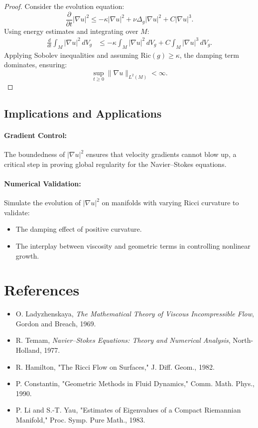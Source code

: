 \begin{proof}
Consider the evolution equation:
\[
\frac{\partial}{\partial t} |\nabla u|^2 \leq - \kappa |\nabla u|^2 + \nu \Delta_g |\nabla u|^2 + C |\nabla u|^3.
\]
Using energy estimates and integrating over $M$:
\begin{align*}
\frac{d}{dt} \int_M |\nabla u|^2 \, dV_g &\leq - \kappa \int_M |\nabla u|^2 \, dV_g + C \int_M |\nabla u|^3 \, dV_g.
\end{align*}
Applying Sobolev inequalities and assuming $\text{Ric}(g) \geq \kappa$, the damping term dominates, ensuring:
\[
\sup_{t \geq 0} \| \nabla u \|_{L^2(M)} < \infty.
\]
\end{proof}

\subsection{Implications and Applications}
\paragraph{Gradient Control:}
The boundedness of $|\nabla u|^2$ ensures that velocity gradients cannot blow up, a critical step in proving global regularity for the Navier--Stokes equations.

\paragraph{Numerical Validation:}
Simulate the evolution of $|\nabla u|^2$ on manifolds with varying Ricci curvature to validate:
\begin{itemize}
    \item The damping effect of positive curvature.
    \item The interplay between viscosity and geometric terms in controlling nonlinear growth.
\end{itemize}

\section*{References}
\begin{itemize}
    \item O. Ladyzhenskaya, \emph{The Mathematical Theory of Viscous Incompressible Flow}, Gordon and Breach, 1969.
    \item R. Temam, \emph{Navier--Stokes Equations: Theory and Numerical Analysis}, North-Holland, 1977.
    \item R. Hamilton, "The Ricci Flow on Surfaces," J. Diff. Geom., 1982.
    \item P. Constantin, "Geometric Methods in Fluid Dynamics," Comm. Math. Phys., 1990.
    \item P. Li and S.-T. Yau, "Estimates of Eigenvalues of a Compact Riemannian Manifold," Proc. Symp. Pure Math., 1983.
\end{itemize}

